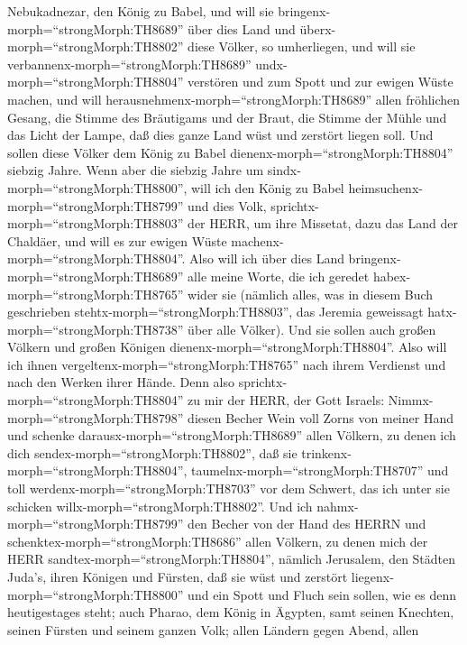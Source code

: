 Nebukadnezar, den König zu Babel, und will sie
bringenx-morph=``strongMorph:TH8689'' über dies Land und
überx-morph=``strongMorph:TH8802'' diese Völker, so umherliegen, und
will sie verbannenx-morph=``strongMorph:TH8689''
undx-morph=``strongMorph:TH8804'' verstören und zum Spott und zur ewigen
Wüste machen,  und will
herausnehmenx-morph=``strongMorph:TH8689'' allen fröhlichen Gesang, die
Stimme des Bräutigams und der Braut, die Stimme der Mühle und das Licht
der Lampe,  daß dies ganze Land wüst und zerstört liegen
soll. Und sollen diese Völker dem König zu Babel
dienenx-morph=``strongMorph:TH8804'' siebzig Jahre.  Wenn
aber die siebzig Jahre um sindx-morph=``strongMorph:TH8800'', will ich
den König zu Babel heimsuchenx-morph=``strongMorph:TH8799'' und dies
Volk, sprichtx-morph=``strongMorph:TH8803'' der HERR, um ihre Missetat,
dazu das Land der Chaldäer, und will es zur ewigen Wüste
machenx-morph=``strongMorph:TH8804''.  Also will ich über
dies Land bringenx-morph=``strongMorph:TH8689'' alle meine Worte, die
ich geredet habex-morph=``strongMorph:TH8765'' wider sie (nämlich alles,
was in diesem Buch geschrieben stehtx-morph=``strongMorph:TH8803'', das
Jeremia geweissagt hatx-morph=``strongMorph:TH8738'' über alle Völker).
 Und sie sollen auch großen Völkern und großen Königen
dienenx-morph=``strongMorph:TH8804''. Also will ich ihnen
vergeltenx-morph=``strongMorph:TH8765'' nach ihrem Verdienst und nach
den Werken ihrer Hände.  Denn also
sprichtx-morph=``strongMorph:TH8804'' zu mir der HERR, der Gott Israels:
Nimmx-morph=``strongMorph:TH8798'' diesen Becher Wein voll Zorns von
meiner Hand und schenke darausx-morph=``strongMorph:TH8689'' allen
Völkern, zu denen ich dich sendex-morph=``strongMorph:TH8802'',
 daß sie trinkenx-morph=``strongMorph:TH8804'',
taumelnx-morph=``strongMorph:TH8707'' und toll
werdenx-morph=``strongMorph:TH8703'' vor dem Schwert, das ich unter sie
schicken willx-morph=``strongMorph:TH8802''.  Und ich
nahmx-morph=``strongMorph:TH8799'' den Becher von der Hand des HERRN und
schenktex-morph=``strongMorph:TH8686'' allen Völkern, zu denen mich der
HERR sandtex-morph=``strongMorph:TH8804'',  nämlich
Jerusalem, den Städten Juda's, ihren Königen und Fürsten, daß sie wüst
und zerstört liegenx-morph=``strongMorph:TH8800'' und ein Spott und
Fluch sein sollen, wie es denn heutigestages steht;  auch
Pharao, dem König in Ägypten, samt seinen Knechten, seinen Fürsten und
seinem ganzen Volk;  allen Ländern gegen Abend, allen
